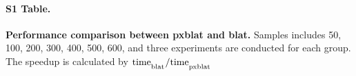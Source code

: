 \documentclass[10pt,letterpaper]{article}
\begin{document}
{%
%
%
%
%

\paragraph*{S1 Table.}
\label{S1_Table}
{\bf Performance comparison between \gls{pxblat} and \gls{blat}.} Samples includes 50, 100, 200, 300, 400, 500, 600, and three experiments are conducted for each group. The speedup is calculated by \(\mathrm{time}_\textsubscript{blat} /  \mathrm{time}_\textsubscript{pxblat} \)

}
\end{document}
